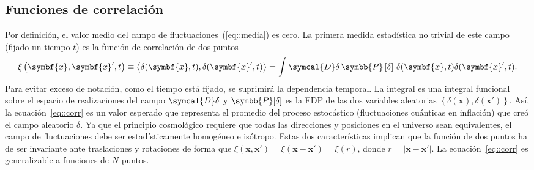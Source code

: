 \subsection{Funciones de correlación}
Por definición, el valor medio del campo de fluctuaciones~(\eqref{eq::media}) es cero. La primera medida estadística no trivial de este campo (fijado un tiempo \(t\)) es la función de correlación de dos puntos
\begin{equation}
    \xi\left(\symbf{x},\symbf{x}',t\right)\equiv\left\langle\delta(\symbf{x},t),\delta(\symbf{x}',t)\right\rangle=\int\symcal{D}\delta\,\symbb{P}\left[\delta\right]\,\delta(\symbf{x},t)\delta(\symbf{x}',t).\label{eq::corr}
\end{equation}
Para evitar exceso de notación, como el tiempo está fijado, se suprimirá la dependencia temporal. La integral es una integral funcional sobre el espacio de realizaciones del campo \(\symcal{D}\delta\) y \(\symbb{P}[\delta]\) es la FDP de las dos variables aleatorias \(\left\lbrace\delta(\symbf{x}),\delta(\symbf{x}')\right\rbrace\). Así, la ecuación~\eqref{eq::corr} es un valor esperado que representa el promedio del proceso estocástico (fluctuaciones cuánticas en inflación) que creó el campo aleatorio \(\delta\). Ya que el principio cosmológico requiere que todas las direcciones y posiciones en el universo sean equivalentes, el campo de fluctuaciones debe ser estadísticamente homogéneo e isótropo. Estas dos características implican que la función de dos puntos ha de ser invariante ante traslaciones y rotaciones de forma que \(\xi(\symbf{x},\symbf{x}')=\xi(\symbf{x}-\symbf{x}')=\xi(r)\), donde \(r=\left|\symbf{x}-\symbf{x}'\right|\). La ecuación~\eqref{eq::corr} es generalizable a funciones de \(N\)-puntos.

